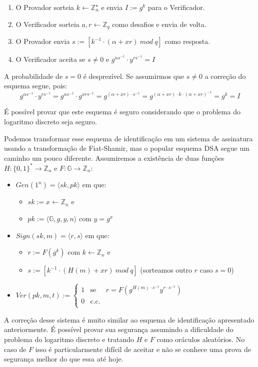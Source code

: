 \begin{enumerate}
\item O Provador sorteia $k \leftarrow \mathbb{Z}_n^\star$ e envia $I := g^k$ para o Verificador.
\item O Verificador sorteia $a, r \leftarrow \mathbb{Z}_q$ como desafios e envia de volta.
\item O Provador envia $s := [k^{-1} \cdot (\alpha + xr)\ mod\ q]$ como resposta.
\item O Verificador aceita se $s \neq 0$ e $g^{\alpha s^{-1}} \cdot y^{rs^{-1}} = I$
\end{enumerate}

A probabilidade de $s = 0$ é desprezível.
Se assumirmos que $s \neq 0$ a correção do esquema segue, pois:
\begin{displaymath}
  g^{\alpha s^{-1}} \cdot y^{rs^{-1}} = g^{\alpha s^{-1}} \cdot g^{xrs^{-1}} = g^{(\alpha + xr)\cdot s^{-1}} = g^{(\alpha + xr)\cdot k \cdot (\alpha + xr)^{-1}} = g^k = I
\end{displaymath}

É possível provar que este esquema é seguro considerando que o problema do logaritmo discreto seja seguro.

Podemos transformar esse esquema de identificação em um sistema de assinatura usando a transformação de Fiat-Shamir, mas o popular esquema DSA segue um caminho um pouco diferente.
Assumiremos a existência de duas funções $H: \{0,1\}^* \to \mathbb{Z}_n$ e $F: \mathbb{G} \to \mathbb{Z}_n$:

\begin{itemize}
\item $Gen(1^n) = \langle sk, pk \rangle$ em que:
\begin{itemize}
\item $sk := x \leftarrow \mathbb{Z}_n$ e
\item $pk := \langle \mathbb{G}, g, y, n \rangle$ com $y = g^x$
\end{itemize}
\item $Sign(sk, m) = \langle r, s \rangle$ em que:
  \begin{itemize}
  \item $r := F(g^k)$ com $k \leftarrow \mathbb{Z}_n$ e
  \item $s := [k^{-1} \cdot (H(m) + xr)\ mod\ q]$ (sorteamos outro $r$ caso $s = 0$)
  \end{itemize}
\item $Ver(pk, m, t) := \left\{
    \begin{array}{lcl}
      1 & \textrm{se} & r = F(g^{H(m) \cdot s^{-1}} y^{r \cdot s^{-1}})\\
      0 & \textrm{c.c.} &\\
    \end{array}
    \right.$
\end{itemize}

A correção desse sistema é muito similar ao esquema de identificação apresentado anteriormente.
É possível provar sua segurança assumindo a dificuldade do problema do logaritmo discreto e tratando $H$ e $F$ como oráculos aleatórios.
No caso de $F$ isso é particularmente difícil de aceitar e não se conhece uma prova de segurança melhor do que essa até hoje.